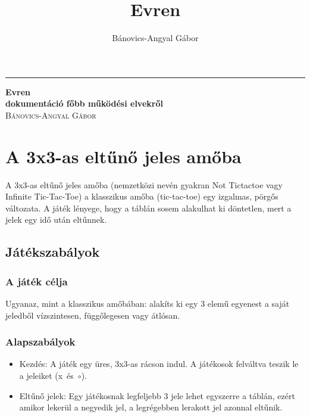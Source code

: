 \documentclass[a4paper, 11pt]{article}
\title{Evren}
\author{Bánovics-Angyal Gábor}
\begin{document}
\begin{titlepage}
	
	\raggedleft 
	
	\rule{1pt}{\textheight} 
	\hspace{0.05\textwidth} 
	\parbox[b]{0.75\textwidth}{
		{\Huge\bfseries Evren \\[0.5\baselineskip] \Large dokumentáció főbb működési elvekről}\\[2\baselineskip]
		{\large\textsc{Bánovics-Angyal Gábor}}
		
		\vspace{0.5\textheight}
		\hspace{8cm}
	}
\end{titlepage}
\pagebreak


\section{A 3x3-as eltűnő jeles amőba}
A 3x3-as eltűnő jeles amőba (nemzetközi nevén gyakran Not Tictactoe vagy Infinite Tic-Tac-Toe) a klasszikus amőba (tic-tac-toe) egy izgalmas, pörgős változata. A játék lényege, hogy a táblán sosem alakulhat ki döntetlen, mert a jelek egy idő után eltűnnek.
\subsection*{Játékszabályok}
\subsubsection*{A játék célja}
Ugyanaz, mint a klasszikus amőbában: alakíts ki egy 3 elemű egyenest a saját jeledből vízszintesen, függőlegesen vagy átlósan.
\subsubsection*{Alapszabályok}
\begin{itemize}
    \item Kezdés: A játék egy üres, 3x3-as rácson indul. A játékosok felváltva teszik le a jeleiket \mbox{(x és $\circ$)}.
    \item Eltűnő jelek: Egy játékosnak legfeljebb 3 jele lehet egyszerre a táblán, ezért amikor lekerül a negyedik jel, a legrégebben lerakott jel azonnal eltűnik.
\end{itemize}
\end{document}
